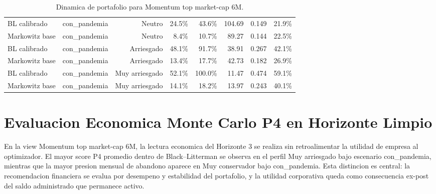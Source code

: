 \documentclass[11pt]{article}
\begin{document}
\begin{table}[H]
{\begin{tabular}{lrrrrrrr}
BL calibrado & con\_pandemia & Neutro & 24.5\% & 43.6\% & 104.69 & 0.149 & 21.9\% \\
Markowitz base & con\_pandemia & Neutro & 8.4\% & 10.7\% & 89.27 & 0.144 & 22.5\% \\
BL calibrado & con\_pandemia & Arriesgado & 48.1\% & 91.7\% & 38.91 & 0.267 & 42.1\% \\
Markowitz base & con\_pandemia & Arriesgado & 13.4\% & 17.7\% & 42.73 & 0.182 & 26.9\% \\
BL calibrado & con\_pandemia & Muy arriesgado & 52.1\% & 100.0\% & 11.47 & 0.474 & 59.1\% \\
Markowitz base & con\_pandemia & Muy arriesgado & 14.1\% & 18.2\% & 13.97 & 0.243 & 40.1\% \\
\bottomrule
\end{tabular}
}
\caption{Dinamica de portafolio para Momentum top market-cap 6M.}
\label{tab:dinamica_momentum_top_marketcap_6m_v1_plus}
\end{table}


\section{Evaluacion Economica Monte Carlo P4 en Horizonte Limpio}

En la view Momentum top market-cap 6M, la lectura economica del Horizonte 3 se realiza sin retroalimentar la utilidad de empresa al optimizador. El mayor score P4 promedio dentro de Black--Litterman se observa en el perfil Muy arriesgado bajo escenario con\_pandemia, mientras que la mayor presion mensual de abandono aparece en Muy conservador bajo con\_pandemia. Esta distincion es central: la recomendacion financiera se evalua por desempeno y estabilidad del portafolio, y la utilidad corporativa queda como consecuencia ex-post del saldo administrado que permanece activo.
\end{document}

